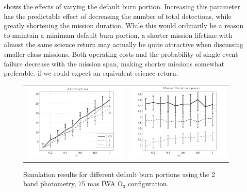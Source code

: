 shows the effects of varying the default burn portion.  Increasing this parameter has the predictable effect of decreasing the number of total detections, while greatly shortening the mission duration.  While this would ordinarily be a reason to maintain a minimum default burn portion, a shorter mission lifetime with almost the same science return may actually be quite attractive when discussing smaller class missions.  Both operating costs  and the probability of single event failure decrease with the mission span, making shorter missions somewhat preferable,  if we could expect an equivalent science return.
 \begin{figure}[ht]
 \begin{center}
  \begin{tabular}{c c}
   \includegraphics[width=2.9in,clip=true,trim=0.25in 0in 0.5in 0in]{./figures/bpComparisonA} &
   \includegraphics[width=2.9in,clip=true,trim=0.25in 0in 0.5in 0in]{./figures/bpComparisonB} 
  \end{tabular}
 \end{center}
 \caption[Effects of varying burn portion]{ \label{fig:bpComparison} Simulation results for different default burn portions using the 2 band photometry, 75 mas IWA O$_3$ configuration.}
 \end{figure}

